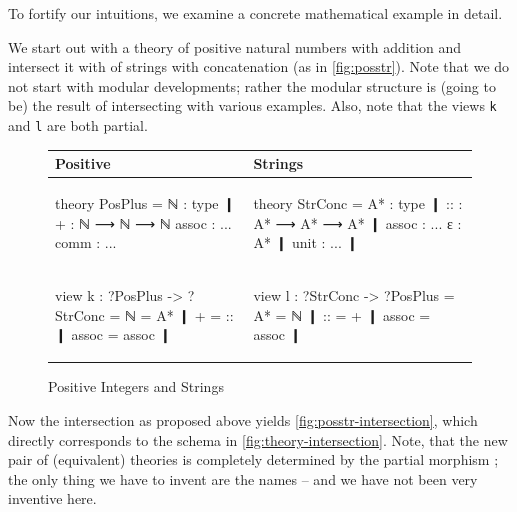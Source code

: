To fortify our intuitions, we examine a concrete mathematical example in detail.

We start out with a theory  of positive natural numbers with addition
and intersect it with  of strings with concatenation (as in \autoref{fig:posstr}). Note that we do
not start with modular developments; rather the modular structure is (going to be) the
result of intersecting with various examples. Also, note that the views \lstinline|k| and \lstinline|l| are both partial.

\begin{figure}[ht]\centering
\begin{tabular}{|p{6cm}|p{6cm}|}\hline
  Positive  & Strings \\\hline
\begin{mmtcode}[aboveskip=-2pt,belowskip=-2pt]
theory PosPlus =
    ℕ : type ❙
    + : ℕ ⟶ ℕ ⟶ ℕ
    assoc : ...
    comm : ...
\end{mmtcode}
& 
\begin{mmtcode}[aboveskip=-2pt,belowskip=-2pt]
theory StrConc =
    A* : type ❙
    :: : A* ⟶ A* ⟶ A* ❙
    assoc : ...
    ε : A* ❙
    unit : ... ❙
\end{mmtcode}
\\[-2pt]\hline
\begin{mmtcode}[aboveskip=-2pt,belowskip=-2pt]
view k : ?PosPlus -> ?StrConc =
    ℕ = A* ❙
    + = :: ❙
    assoc = assoc ❙
\end{mmtcode}
&
\begin{mmtcode}[aboveskip=-2pt,belowskip=-2pt]
view l : ?StrConc -> ?PosPlus =
    A* = ℕ ❙
    :: = + ❙
    assoc = assoc ❙
\end{mmtcode}
\\[-2pt]\hline
\end{tabular}
\caption{Positive Integers and Strings}\label{fig:posstr}\vspace*{-1.5em}
\end{figure}

Now the intersection as proposed above yields
\autoref{fig:posstr-intersection}, which directly corresponds to the schema in
\autoref{fig:theory-intersection}. 
Note, that the new pair of (equivalent) theories is completely
determined by the partial morphism ; the only thing we have to invent are the names
-- and we have not been very inventive here.

